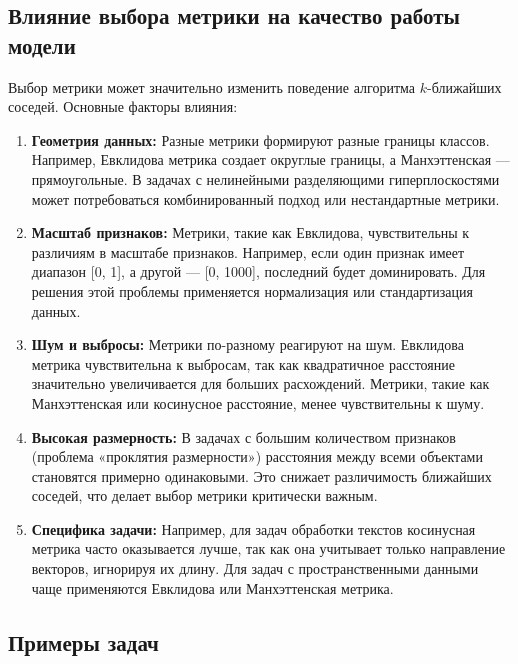 \subsection{Влияние выбора метрики на качество работы модели}

Выбор метрики может значительно изменить поведение алгоритма \(k\)-ближайших соседей. Основные факторы влияния:

\begin{enumerate}
    \item \textbf{Геометрия данных:}
    Разные метрики формируют разные границы классов. Например, Евклидова метрика создает округлые границы, а Манхэттенская — прямоугольные. В задачах с нелинейными разделяющими гиперплоскостями может потребоваться комбинированный подход или нестандартные метрики.

    \item \textbf{Масштаб признаков:}
    Метрики, такие как Евклидова, чувствительны к различиям в масштабе признаков. Например, если один признак имеет диапазон [0, 1], а другой — [0, 1000], последний будет доминировать. Для решения этой проблемы применяется нормализация или стандартизация данных.

    \item \textbf{Шум и выбросы:}
    Метрики по-разному реагируют на шум. Евклидова метрика чувствительна к выбросам, так как квадратичное расстояние значительно увеличивается для больших расхождений. Метрики, такие как Манхэттенская или косинусное расстояние, менее чувствительны к шуму.

    \item \textbf{Высокая размерность:}
    В задачах с большим количеством признаков (проблема «проклятия размерности») расстояния между всеми объектами становятся примерно одинаковыми. Это снижает различимость ближайших соседей, что делает выбор метрики критически важным.

    \item \textbf{Специфика задачи:}
    Например, для задач обработки текстов косинусная метрика часто оказывается лучше, так как она учитывает только направление векторов, игнорируя их длину. Для задач с пространственными данными чаще применяются Евклидова или Манхэттенская метрика.
\end{enumerate}

\subsection{Примеры задач}

